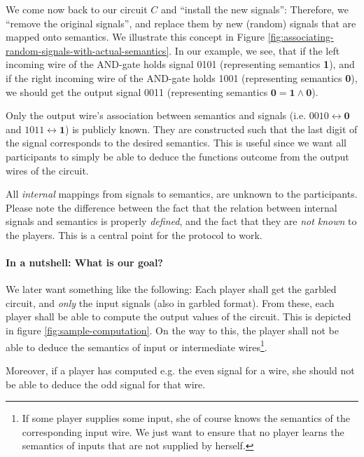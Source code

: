 We come now back to our circuit $C$ and ``install the new signals'': Therefore, we ``remove the original signals'', and replace them by new (random) signals that are mapped onto semantics. We illustrate this concept in Figure \ref{fig:associating-random-signals-with-actual-semantics}. In our example, we see, that if the left incoming wire of the AND-gate holds signal 0101 (representing semantics \textbf{1}), and if the right incoming wire of the AND-gate holds 1001 (representing semantics \textbf{0}), we should get the output signal 0011 (representing semantics $\mathbf{0}=\mathbf{1}\wedge \mathbf{0}$).

Only the output wire's association between semantics and signals (i.e. $0010\leftrightarrow \mathbf{0}$ and $1011\leftrightarrow \mathbf{1}$) is publicly known. They are constructed such that the last digit of the signal corresponds to the desired semantics. This is useful since we want all participants to simply be able to deduce the functions outcome from the output wires of the circuit.

All \emph{internal} mappings from signals to semantics, are unknown to the participants. Please note the difference between the fact that the relation between internal signals and semantics is properly \emph{defined}, and the fact that they are \emph{not known} to the players. This is a central point for the protocol to work.

\paragraph{In a nutshell: What is our goal?}

We later want something like the following: Each player shall get the garbled circuit, and \emph{only} the input signals (also in garbled format). From these, each player shall be able to compute the output values of the circuit. This is depicted in figure \ref{fig:sample-computation}. On the way to this, the player shall not be able to deduce the semantics of input or intermediate wires\footnote{If some player supplies some input, she of course knows the semantics of the corresponding input wire. We just want to ensure that no player learns the semantics of inputs that are not supplied by herself.}.

Moreover, if a player has computed e.g. the even signal for a wire, she should not be able to deduce the odd signal for that wire.

